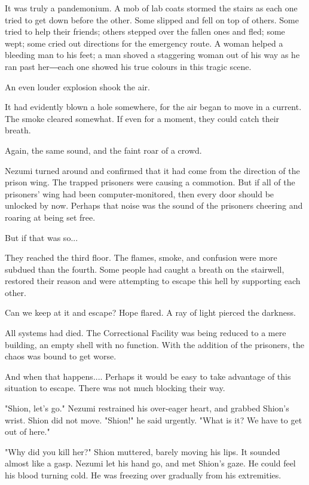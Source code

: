 It was truly a pandemonium. A mob of lab coats stormed the stairs as
each one tried to get down before the other. Some slipped and fell on
top of others. Some tried to help their friends; others stepped over the
fallen ones and fled; some wept; some cried out directions for the
emergency route. A woman helped a bleeding man to his feet; a man shoved
a staggering woman out of his way as he ran past her―each one showed his
true colours in this tragic scene.

An even louder explosion shook the air.

It had evidently blown a hole somewhere, for the air began to move in a
current. The smoke cleared somewhat. If even for a moment, they could
catch their breath.

Again, the same sound, and the faint roar of a crowd.

Nezumi turned around and confirmed that it had come from the direction
of the prison wing. The trapped prisoners were causing a commotion. But
if all of the prisoners' wing had been computer-monitored, then every
door should be unlocked by now. Perhaps that noise was the sound of the
prisoners cheering and roaring at being set free.

But if that was so...

They reached the third floor. The flames, smoke, and confusion were more
subdued than the fourth. Some people had caught a breath on the
stairwell, restored their reason and were attempting to escape this hell
by supporting each other.

Can we keep at it and escape? Hope flared. A ray of light pierced the
darkness.

All systems had died. The Correctional Facility was being reduced to a
mere building, an empty shell with no function. With the addition of the
prisoners, the chaos was bound to get worse.

And when that happens.... Perhaps it would be easy to take advantage of
this situation to escape. There was not much blocking their way.

"Shion, let's go." Nezumi restrained his over-eager heart, and grabbed
Shion's wrist. Shion did not move. "Shion!" he said urgently. "What is
it? We have to get out of here."

"Why did you kill her?" Shion muttered, barely moving his lips. It
sounded almost like a gasp. Nezumi let his hand go, and met Shion's
gaze. He could feel his blood turning cold. He was freezing over
gradually from his extremities.

